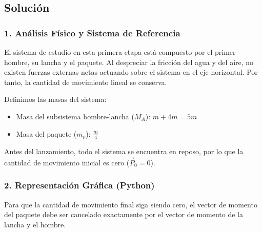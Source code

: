 \documentclass[12pt, a4paper]{article}
\begin{document}
\begin{center}
\end{center}

\subsection*{Solución}

\subsubsection*{1. Análisis Físico y Sistema de Referencia}
El sistema de estudio en esta primera etapa está compuesto por el primer hombre, su lancha y el paquete. Al despreciar la fricción del agua y del aire, no existen fuerzas externas netas actuando sobre el sistema en el eje horizontal. Por tanto, la cantidad de movimiento lineal se conserva.

Definimos las masas del sistema:
\begin{itemize}
    \item Masa del subsistema hombre-lancha ($M_A$): $m + 4m = 5m$
    \item Masa del paquete ($m_p$): $\frac{m}{4}$
\end{itemize}

Antes del lanzamiento, todo el sistema se encuentra en reposo, por lo que la cantidad de movimiento inicial es cero ($\vec{P}_0 = 0$).

\subsubsection*{2. Representación Gráfica (Python)}
Para que la cantidad de movimiento final siga siendo cero, el vector de momento del paquete debe ser cancelado exactamente por el vector de momento de la lancha y el hombre.
\end{document}

